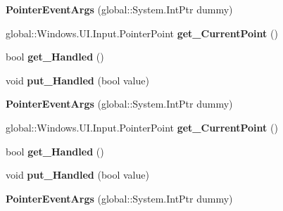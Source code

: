 \begin{DoxyCompactItemize}
{\bfseries Pointer\+Event\+Args} (global\+::\+System.\+Int\+Ptr dummy)
\item 
\mbox{\label{class_windows_1_1_u_i_1_1_core_1_1_pointer_event_args_a60253996efe6aa23360bb39f0288c55b}} 
global\+::\+Windows.\+U\+I.\+Input.\+Pointer\+Point {\bfseries get\+\_\+\+Current\+Point} ()
\item 
\mbox{\label{class_windows_1_1_u_i_1_1_core_1_1_pointer_event_args_ae5099383c4d10dec571b026258afc87e}} 
bool {\bfseries get\+\_\+\+Handled} ()
\item 
\mbox{\label{class_windows_1_1_u_i_1_1_core_1_1_pointer_event_args_ae122ac0156bd8ce343b58330f9715614}} 
void {\bfseries put\+\_\+\+Handled} (bool value)
\item 
\mbox{\label{class_windows_1_1_u_i_1_1_core_1_1_pointer_event_args_a47975f7ef4543d7e006ef3d76a69e42d}} 
{\bfseries Pointer\+Event\+Args} (global\+::\+System.\+Int\+Ptr dummy)
\item 
\mbox{\label{class_windows_1_1_u_i_1_1_core_1_1_pointer_event_args_a60253996efe6aa23360bb39f0288c55b}} 
global\+::\+Windows.\+U\+I.\+Input.\+Pointer\+Point {\bfseries get\+\_\+\+Current\+Point} ()
\item 
\mbox{\label{class_windows_1_1_u_i_1_1_core_1_1_pointer_event_args_ae5099383c4d10dec571b026258afc87e}} 
bool {\bfseries get\+\_\+\+Handled} ()
\item 
\mbox{\label{class_windows_1_1_u_i_1_1_core_1_1_pointer_event_args_ae122ac0156bd8ce343b58330f9715614}} 
void {\bfseries put\+\_\+\+Handled} (bool value)
\item 
\mbox{\label{class_windows_1_1_u_i_1_1_core_1_1_pointer_event_args_a47975f7ef4543d7e006ef3d76a69e42d}} 
{\bfseries Pointer\+Event\+Args} (global\+::\+System.\+Int\+Ptr dummy)
\item 

\end{DoxyCompactItemize}
